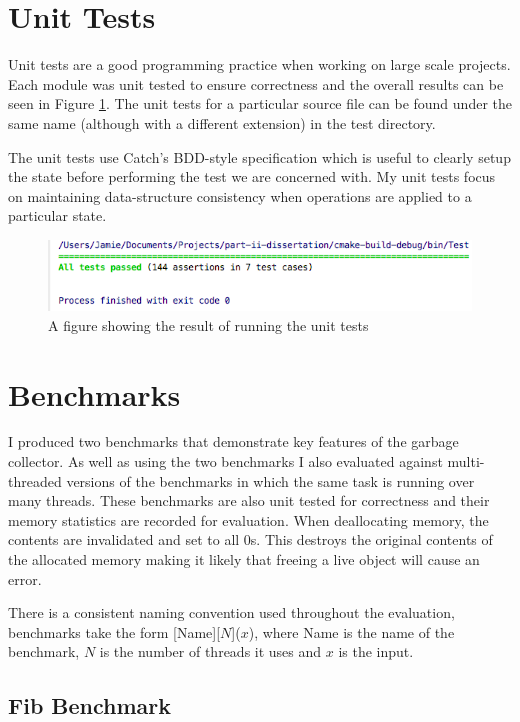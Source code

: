 \documentclass[../diss.tex]{subfiles}
\begin{document}
\section{Unit Tests}

Unit tests are a good programming practice when working on large scale projects. Each module was unit tested to ensure correctness and the overall results can be seen in Figure \ref{fig:unittests}. The unit tests for a particular source file can be found under the same name (although with a different extension) in the test directory.

The unit tests use Catch's BDD-style specification which is useful to clearly setup the state before performing the test we are concerned with. My unit tests focus on maintaining data-structure consistency when operations are applied to a particular state.

\begin{figure}[h]
    \centering
    \includegraphics[max width=\linewidth]{figs/unittests.png}
    \caption{A figure showing the result of running the unit tests}
    \label{fig:unittests}
\end{figure}

\section{Benchmarks} \label{sec:benchmarks}

I produced two benchmarks that demonstrate key features of the garbage collector. As well as using the two benchmarks I also evaluated against multi-threaded versions of the benchmarks in which the same task is running over many threads. These benchmarks are also unit tested for correctness and their memory statistics are recorded for evaluation. When deallocating memory, the contents are invalidated and set to all 0s. This destroys the original contents of the allocated memory making it likely that freeing a live object will cause an error.

There is a consistent naming convention used throughout the evaluation, benchmarks take the form [Name][$N$]($x$), where Name is the name of the benchmark, $N$ is the number of threads it uses and $x$ is the input.

\subsection{Fib Benchmark}
\end{document}

